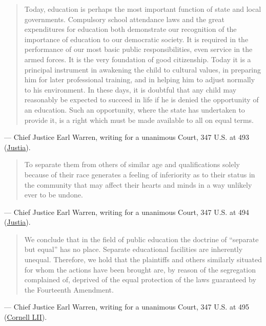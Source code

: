 \documentclass[12pt]{article}
\begin{document}
\begin{quote}
Today, education is perhaps the most important function of state and local governments. Compulsory school attendance laws and the great expenditures for education both demonstrate our recognition of the importance of education to our democratic society. It is required in the performance of our most basic public responsibilities, even service in the armed forces. It is the very foundation of good citizenship. Today it is a principal instrument in awakening the child to cultural values, in preparing him for later professional training, and in helping him to adjust normally to his environment. In these days, it is doubtful that any child may reasonably be expected to succeed in life if he is denied the opportunity of an education. Such an opportunity, where the state has undertaken to provide it, is a right which must be made available to all on equal terms.
\end{quote}
\noindent --- Chief Justice Earl Warren, writing for a unanimous Court, 347 U.S. at 493 (\href{https://supreme.justia.com/cases/federal/us/347/483/}{Justia}).

\begin{quote}
To separate them from others of similar age and qualifications solely because of their race generates a feeling of inferiority as to their status in the community that may affect their hearts and minds in a way unlikely ever to be undone.
\end{quote}
\noindent --- Chief Justice Earl Warren, writing for a unanimous Court, 347 U.S. at 494 (\href{https://supreme.justia.com/cases/federal/us/347/483/}{Justia}).

\begin{quote}
We conclude that in the field of public education the doctrine of ``separate but equal'' has no place. Separate educational facilities are inherently unequal. Therefore, we hold that the plaintiffs and others similarly situated for whom the actions have been brought are, by reason of the segregation complained of, deprived of the equal protection of the laws guaranteed by the Fourteenth Amendment.
\end{quote}
\noindent --- Chief Justice Earl Warren, writing for a unanimous Court, 347 U.S. at 495 (\href{https://www.law.cornell.edu/supremecourt/text/347/483/USSC_PRO_347_483_1}{Cornell LII}).
\end{document}
